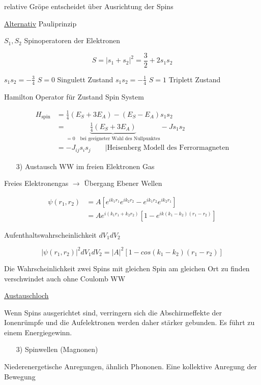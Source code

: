 relative Gröpe entscheidet über Ausrichtung der Spins

\underline{Alternativ} Pauliprinzip

\(S_1,S_2\) Spinoperatoren der Elektronen

\[S = |s_1+s_2|^2 = \frac{3}{2}+2s_1s_2\]

\(s_1s_2 = -\frac{3}{4}\) \(S=0\) Singulett Zustand
\(s_1s_2 = -\frac{1}{4}\) \(S=1\) Triplett Zustand

Hamilton Operator für Zustand Spin System

\begin{align}
H_{\text{spin}}&=\frac{1}{4}(E_S+3E_A)-(E_S-E_A)s_1s_2 \\
&=\underbrace{\frac{1}{4}(E_S+3E_A)}_{=0\quad \text{bei geeigneter Wahl des Nullpunktes}}-Js_1s_2 \\
&= -J_{ij}s_is_j\qquad |\text{Heisenberg Modell des Ferrormagneten}
\end{align}

\begin{itemize}
\item[3)] Austausch WW im freien Elektronen Gas
\end{itemize}

Freies Elektronengas \(\rightarrow \) Übergang Ebener Wellen

\begin{align}
\psi(r_1,r_2) &= A\left[e^{ik_1r_1}e^{ik_2r_2}- e^{ik_1r_2}e^{ik_2r_1}  \right]\\
&=Ae^{i(k_1r_1+k_2r_2)}\left[1-e^{ik(k_1-k_2)(r_1-r_2)}\right]
\end{align}

Aufenthaltswahrscheinlichkeit \(dV_1dV_2\)

\[|\psi(r_1,r_2)|^2dV_1dV_2 = |A|^2 \left[1-cos(k_1-k_2)(r_1-r_2)\right]\]

Die Wahrscheinlichkeit zwei Spins mit gleichen Spin am gleichen Ort zu finden verschwindet auch ohne Coulomb WW

\underline{Austauschloch}

Wenn Spins ausgerichtet sind, verringern sich die Abschirmeffekte der Ionenrümpfe und die Aufelektronen werden daher stärker gebunden. Es führt zu einem Energiegewinn.


\begin{itemize}
\item[3)] Spinwellen (Magnonen)
\end{itemize}


Niederenergetische Anregungen, ähnlich Phononen. Eine kollektive Anregung der Bewegung

